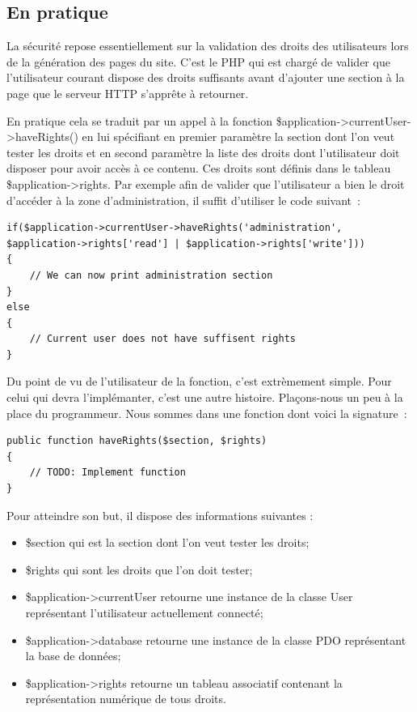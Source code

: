 \documentclass[letter, 10pt]{report}
\begin{document}
\subsection{En pratique}
La sécurité repose essentiellement sur la validation des droits des utilisateurs lors de la génération des pages du site. C'est le PHP qui est chargé de valider que l'utilisateur courant dispose des droits suffisants avant d'ajouter une section à la page que le serveur HTTP s’apprête à retourner.

En pratique cela se traduit par un appel à la fonction \$application->currentUser->haveRights() en lui spécifiant en premier paramètre la section dont l'on veut tester les droits et en second paramètre la liste des droits dont l'utilisateur doit disposer pour avoir accès à ce contenu. Ces droits sont définis dans le tableau \$application->rights. Par exemple afin de valider que l'utilisateur a bien le droit d'accéder à la zone d'administration, il suffit d'utiliser le code suivant~:

\begin{lstlisting}[style=php]
if($application->currentUser->haveRights('administration', $application->rights['read'] | $application->rights['write']))
{
	// We can now print administration section
}
else
{
	// Current user does not have suffisent rights
}
\end{lstlisting}

Du point de vu de l'utilisateur de la fonction, c'est extrèmement simple. Pour celui qui devra l'implémanter, c'est une autre histoire. Plaçons-nous un peu à la place du programmeur. Nous sommes dans une fonction dont voici la signature~:

\begin{lstlisting}[style=php]
public function haveRights($section, $rights)
{
	// TODO: Implement function
}
\end{lstlisting}

Pour atteindre son but, il dispose des informations suivantes :

\begin{itemize}
	\item \$section qui est la section dont l'on veut tester les droits;
	\item \$rights qui sont les droits que l'on doit tester;
	\item \$application->currentUser retourne une instance de la classe User représentant l'utilisateur actuellement connecté;
	\item \$application->database retourne une instance de la classe PDO représentant la base de données;
	\item \$application->rights retourne un tableau associatif contenant la représentation numérique de tous droits.
\end{itemize}
\end{document}
